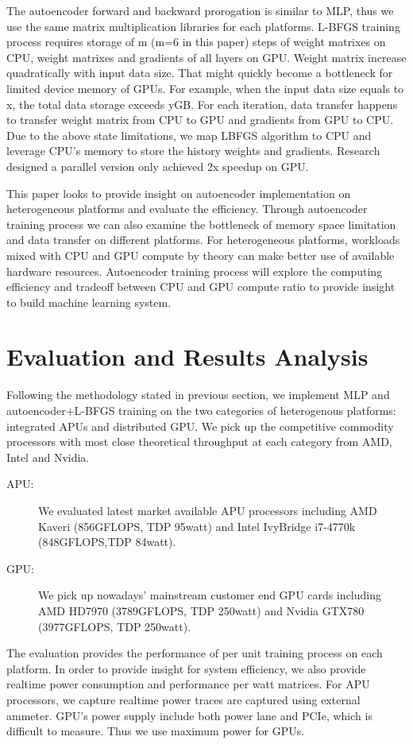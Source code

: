 \documentclass{article}
\begin{document}
The autoencoder forward and backward prorogation is similar to MLP, thus we use the same matrix multiplication libraries for each platforms.
L-BFGS training process requires storage of m (m=6 in this paper) steps of weight matrixes on CPU, weight matrixes and gradients of all layers on GPU.
Weight matrix increase quadratically with input data size. That might quickly become a bottleneck for limited device memory of GPUs.
For example, when the input data size equals to x, the total data storage exceeds yGB.
For each iteration, data transfer happens to transfer weight matrix from CPU to GPU and gradients from GPU to CPU.
Due to the above state limitations, we map LBFGS algorithm to CPU and leverage CPU's memory to store the history weights and gradients.
Research\cite{QuocLe2011} designed a parallel version only achieved 2x speedup on GPU.

This paper looks to provide insight on autoencoder implementation on heterogeneous platforms and evaluate the efficiency.
Through autoencoder training process we can also examine the bottleneck of memory space limitation and data transfer on different platforms.
For heterogeneous platforms, workloads mixed with CPU and GPU compute by theory can make better use of available hardware resources.
Autoencoder training process will explore the computing efficiency and tradeoff between CPU and GPU compute ratio to provide insight to build machine learning system.


\section{Evaluation and Results Analysis}
Following the methodology stated in previous section, we implement MLP and autoencoder+L-BFGS training on the two categories of heterogenous platforms: integrated APUs and distributed GPU.
We pick up the competitive commodity processors with most close theoretical throughput at each category from AMD, Intel and Nvidia.
\begin{description}
  \item[APU:]  We evaluated latest market available APU processors including AMD Kaveri (856GFLOPS, TDP 95watt) and Intel IvyBridge i7-4770k (848GFLOPS,TDP 84watt). 
  \item[GPU:]  We pick up nowadays' mainstream customer end GPU cards including AMD HD7970 (3789GFLOPS, TDP 250watt) and Nvidia GTX780 (3977GFLOPS, TDP 250watt). 
\end{description}
The evaluation provides the performance of per unit training process on each platform.
In order to provide insight for system efficiency, we also provide realtime power consumption and performance per watt matrices.
For APU processors, we capture realtime power traces are captured using external ammeter. 
GPU's power supply include both power lane and PCIe, which is difficult to measure. Thus we use maximum power for GPUs.  
\end{document}
